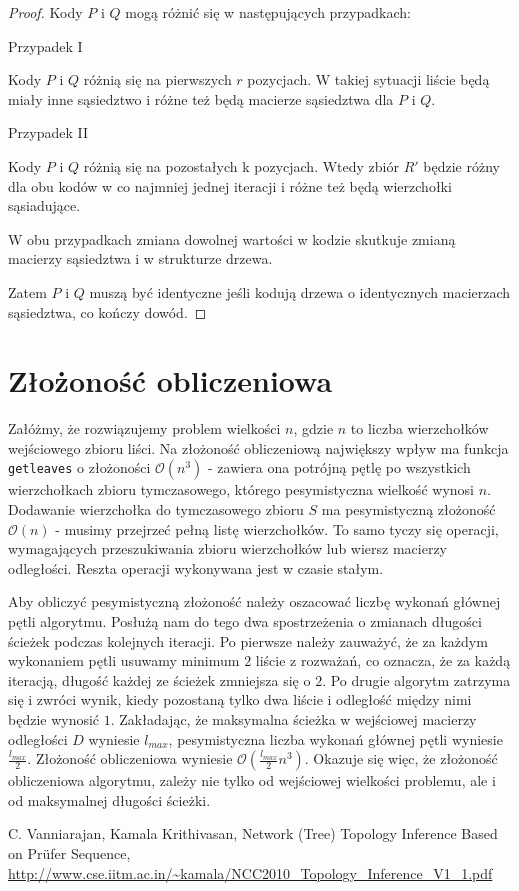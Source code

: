 \documentclass[a4paper,12p]{article}
\begin{document}
\begin{proof}
Kody $P$ i $Q$ mogą różnić się w następujących przypadkach:

Przypadek I

Kody $P$ i $Q$ różnią się na pierwszych $r$ pozycjach. W takiej sytuacji liście będą miały inne sąsiedztwo i różne też będą macierze sąsiedztwa dla $P$ i $Q$.

Przypadek II

Kody $P$ i $Q$ różnią się na pozostałych k pozycjach. Wtedy zbiór $R'$ będzie różny dla obu kodów w co najmniej jednej iteracji i różne też będą wierzchołki sąsiadujące.

W obu przypadkach zmiana dowolnej wartości w kodzie skutkuje zmianą macierzy sąsiedztwa i w strukturze drzewa.

Zatem $P$ i $Q$ muszą być identyczne jeśli kodują drzewa o identycznych macierzach sąsiedztwa, co kończy dowód.
\end{proof}


\section{Złożoność obliczeniowa}

Załóżmy, że rozwiązujemy problem wielkości $n$, gdzie $n$ to liczba wierzchołków wejściowego zbioru liści. Na złożoność obliczeniową największy wpływ ma funkcja \texttt{getleaves} o złożoności $\mathcal{O}(n^3)$ - zawiera ona potrójną pętlę po wszystkich wierzchołkach zbioru tymczasowego, którego pesymistyczna wielkość wynosi $n$. Dodawanie wierzchołka do tymczasowego zbioru $S$ ma pesymistyczną złożoność $\mathcal{O}(n)$ - musimy przejrzeć pełną listę wierzchołków. To samo tyczy się operacji, wymagających przeszukiwania zbioru wierzchołków lub wiersz macierzy odległości. Reszta operacji wykonywana jest w czasie stałym.

Aby obliczyć pesymistyczną złożoność należy oszacować liczbę wykonań głównej pętli algorytmu. Posłużą nam do tego dwa spostrzeżenia o zmianach długości ścieżek podczas kolejnych iteracji. Po pierwsze należy zauważyć, że za każdym wykonaniem pętli usuwamy minimum $2$ liście z rozważań, co oznacza, że za każdą iteracją, długość każdej ze ścieżek zmniejsza się o $2$. Po drugie algorytm zatrzyma się i zwróci wynik, kiedy pozostaną tylko dwa liście i odległość między nimi będzie wynosić $1$. Zakładając, że maksymalna ścieżka w wejściowej macierzy odległości $D$ wyniesie $l_{max}$, pesymistyczna liczba wykonań głównej pętli wyniesie $\frac{l_{max}}{2}$. Złożoność obliczeniowa wyniesie $\mathcal{O}(\frac{l_{max}}{2} n^3)$. Okazuje się więc, że złożoność obliczeniowa algorytmu, zależy nie tylko od wejściowej wielkości problemu, ale i od maksymalnej długości ścieżki.

\newpage

\begin{thebibliography}{1}
 C. Vanniarajan, Kamala Krithivasan, Network (Tree) Topology Inference Based on Prüfer Sequence, \url{http://www.cse.iitm.ac.in/~kamala/NCC2010_Topology_Inference_V1_1.pdf}
\end{thebibliography}
\end{document}
